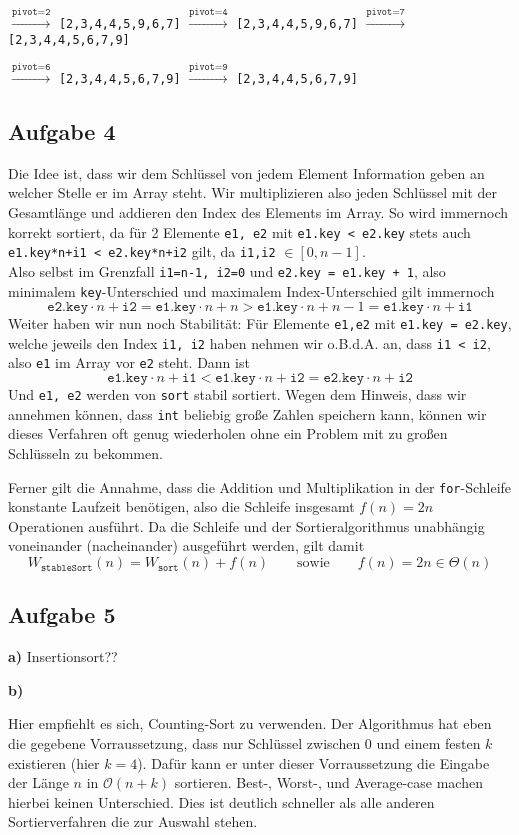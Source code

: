 \documentclass[a4paper,graphics,11pt]{article}
\newcommand{\aufgabe}[1]{\subsection*{Aufgabe #1}}
\begin{document}
$\xrightarrow{\texttt{pivot=2}}$ \texttt{[2,3,4,4,5,9,6,7]}
$\xrightarrow{\texttt{pivot=4}}$ \texttt{[2,3,4,4,5,9,6,7]}
$\xrightarrow{\texttt{pivot=7}}$ \texttt{[2,3,4,4,5,6,7,9]}

$\xrightarrow{\texttt{pivot=6}}$ \texttt{[2,3,4,4,5,6,7,9]}
$\xrightarrow{\texttt{pivot=9}}$ \texttt{[2,3,4,4,5,6,7,9]}

\aufgabe{4}

Die Idee ist, dass wir dem Schlüssel von jedem Element Information geben an welcher Stelle er im Array steht. Wir multiplizieren
also jeden Schlüssel mit der Gesamtlänge und addieren den Index des Elements im Array. So wird immernoch korrekt sortiert,
da für 2 Elemente \texttt{e1, e2} mit \texttt{e1.key < e2.key} stets auch \texttt{e1.key*n+i1 < e2.key*n+i2} gilt, da
\texttt{i1,i2} $\in [0, n-1]$.\\
Also selbst im Grenzfall \texttt{i1=n-1, i2=0} und \texttt{e2.key = e1.key + 1}, also minimalem \texttt{key}-Unterschied
und maximalem Index-Unterschied gilt immernoch
$$
    \texttt{e2.key}\cdot n + \texttt{i2} = \texttt{e1.key}\cdot n + n > \texttt{e1.key}\cdot n + n-1 = \texttt{e1.key}\cdot n +\texttt{i1}
$$
Weiter haben wir nun noch Stabilität: Für Elemente \texttt{e1,e2} mit \texttt{e1.key = e2.key}, welche
jeweils den Index \texttt{i1, i2} haben nehmen wir o.B.d.A. an, dass \texttt{i1 < i2}, also \texttt{e1} im Array
vor \texttt{e2} steht. Dann ist
$$
    \texttt{e1.key}\cdot n + \texttt{i1} < \texttt{e1.key}\cdot n + \texttt{i2} = \texttt{e2.key}\cdot n + \texttt{i2}
$$
Und \texttt{e1, e2} werden von \texttt{sort} stabil sortiert. Wegen dem Hinweis, dass wir annehmen können, dass
\texttt{int} beliebig große Zahlen speichern kann, können wir dieses Verfahren oft genug wiederholen ohne ein Problem
mit zu großen Schlüsseln zu bekommen.

Ferner gilt die Annahme, dass die Addition und Multiplikation in der \texttt{for}-Schleife konstante Laufzeit benötigen,
also die Schleife insgesamt $f(n) = 2n$ Operationen ausführt. Da die Schleife und der Sortieralgorithmus unabhängig voneinander
(nacheinander) ausgeführt werden, gilt damit
$$
    W_{\texttt{stableSort}}(n) = W_{\texttt{sort}}(n) + f(n)
    \qquad\text{sowie}\qquad
    f(n) = 2n \in \Theta(n)
$$

\aufgabe{5}
\textbf{a)}
Insertionsort??

\newpage
\textbf{b)}

Hier empfiehlt es sich, Counting-Sort zu verwenden. Der Algorithmus hat eben die gegebene Vorraussetzung, dass
nur Schlüssel zwischen 0 und einem festen $k$ existieren (hier $k=4$). Dafür kann er unter dieser Vorraussetzung
die Eingabe der Länge $n$ in $\mathcal{O}(n+k)$ sortieren. Best-, Worst-, und Average-case machen hierbei keinen Unterschied.
Dies ist deutlich schneller als alle anderen Sortierverfahren die zur Auswahl stehen.
\end{document}

